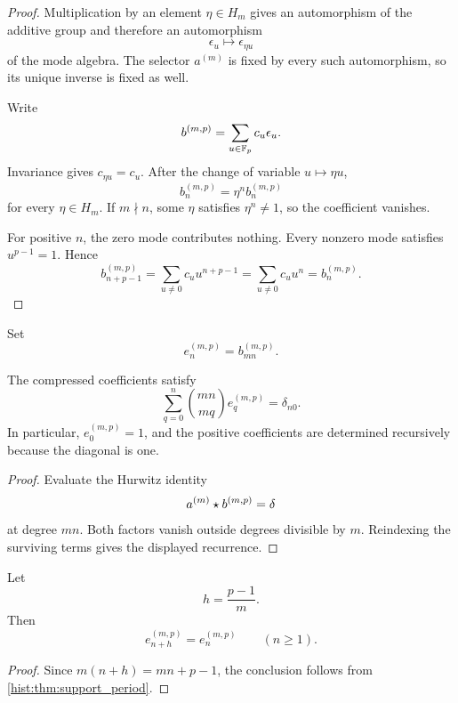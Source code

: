\begin{proof}
Multiplication by an element \(\eta\in H_m\) gives an automorphism of the additive group and therefore an automorphism
\[
\epsilon_u\longmapsto\epsilon_{\eta u}
\]
of the mode algebra. The selector \(a^{(m)}\) is fixed by every such automorphism, so its unique inverse is fixed as well.

Write
\[
b^{(m,p)}
=
\sum_{u\in\mathbb F_p}c_u\epsilon_u.
\]
Invariance gives \(c_{\eta u}=c_u\). After the change of variable \(u\mapsto\eta u\),
\[
b_n^{(m,p)}
=
\eta^n b_n^{(m,p)}
\]
for every \(\eta\in H_m\). If \(m\nmid n\), some \(\eta\) satisfies \(\eta^n\neq1\), so the coefficient vanishes.

For positive \(n\), the zero mode contributes nothing. Every nonzero mode satisfies \(u^{p-1}=1\). Hence
\[
b_{n+p-1}^{(m,p)}
=
\sum_{u\neq0}c_uu^{n+p-1}
=
\sum_{u\neq0}c_uu^n
=
b_n^{(m,p)}.
\]
\end{proof}

\begin{histdefinition}\label{hist:def:compressed_inverse}
Set
\[
e_n^{(m,p)}
=
b_{mn}^{(m,p)}.
\]
\end{histdefinition}

\begin{histproposition}\label{hist:prop:compressed_inverse_recurrence}
The compressed coefficients satisfy
\[
\boxed{
\sum_{q=0}^{n}
\binom{mn}{mq}
e_q^{(m,p)}
=
\delta_{n0}.
}
\]
In particular, \(e_0^{(m,p)}=1\), and the positive coefficients are determined recursively because the diagonal is one.
\end{histproposition}

\begin{proof}
Evaluate the Hurwitz identity
\[
a^{(m)}\mathbin{\star} b^{(m,p)}=\delta
\]
at degree \(mn\). Both factors vanish outside degrees divisible by \(m\). Reindexing the surviving terms gives the displayed recurrence.
\end{proof}

\begin{histcorollary}\label{hist:cor:compressed_period}
Let
\[
h=\frac{p-1}{m}.
\]
Then
\[
\boxed{
e_{n+h}^{(m,p)}
=
e_n^{(m,p)}
\qquad(n\geq1).
}
\]
\end{histcorollary}

\begin{proof}
Since \(m(n+h)=mn+p-1\), the conclusion follows from \cref{hist:thm:support_period}.
\end{proof}

